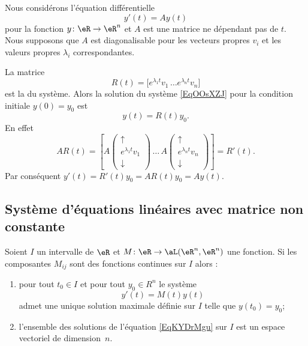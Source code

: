 Nous considérons l'équation différentielle
\begin{equation}    \label{EqOOsXZJ}
	y'(t)=Ay(t)
\end{equation}
pour la fonction \( y\colon \eR\to \eR^n\) et \( A\) est une matrice ne dépendant pas de \( t\). Nous supposons que \( A\) est diagonalisable pour les vecteurs propres \( v_i\) et les valeurs propres \( \lambda_i\) correspondantes.

La matrice
\begin{equation}
	R(t)=\big[  e^{\lambda_1t}v_1\, \ldots  e^{\lambda_nt}v_n \big]
\end{equation}
est la  du système. Alors la solution du système \eqref{EqOOsXZJ} pour la condition initiale \( y(0)=y_0\) est
\begin{equation}
	y(t)=R(t)y_0.
\end{equation}
En effet
\begin{equation}
	AR(t)=\left[  A\begin{pmatrix}
			\uparrow          \\
			e^{\lambda_1t}v_1 \\
			\downarrow
		\end{pmatrix}\,\ldots\,A\begin{pmatrix}
			\uparrow          \\
			e^{\lambda_nt}v_n \\
			\downarrow
		\end{pmatrix}\right]=R'(t).
\end{equation}
Par conséquent \( y'(t)=R'(t)y_0=AR(t)y_0=Ay(t)\).

\subsection{Système d'équations linéaires avec matrice non constante}

\begin{theorem}     \label{ThoNYEXqxO}
	Soient \( I\) un intervalle de \( \eR\) et \( M\colon \eR\to \aL(\eR^n,\eR^n)\) une fonction. Si les composantes \( M_{ij}\) sont des fonctions continues sur \( I\) alors :
	\begin{enumerate}
		\item
		      pour tout \( t_0\in I\) et pour tout \( y_0\in R^n\) le système
		      \begin{equation}    \label{EqKYDrMgu}
			      y'(t)=M(t)y(t)
		      \end{equation}
		      admet une unique solution maximale définie sur \( I\) telle que \( y(t_0)=y_0\);
		\item
		      l'ensemble des solutions de l'équation \eqref{EqKYDrMgu} sur \( I\) est un espace vectoriel de dimension~\( n\).
	\end{enumerate}
\end{theorem}

